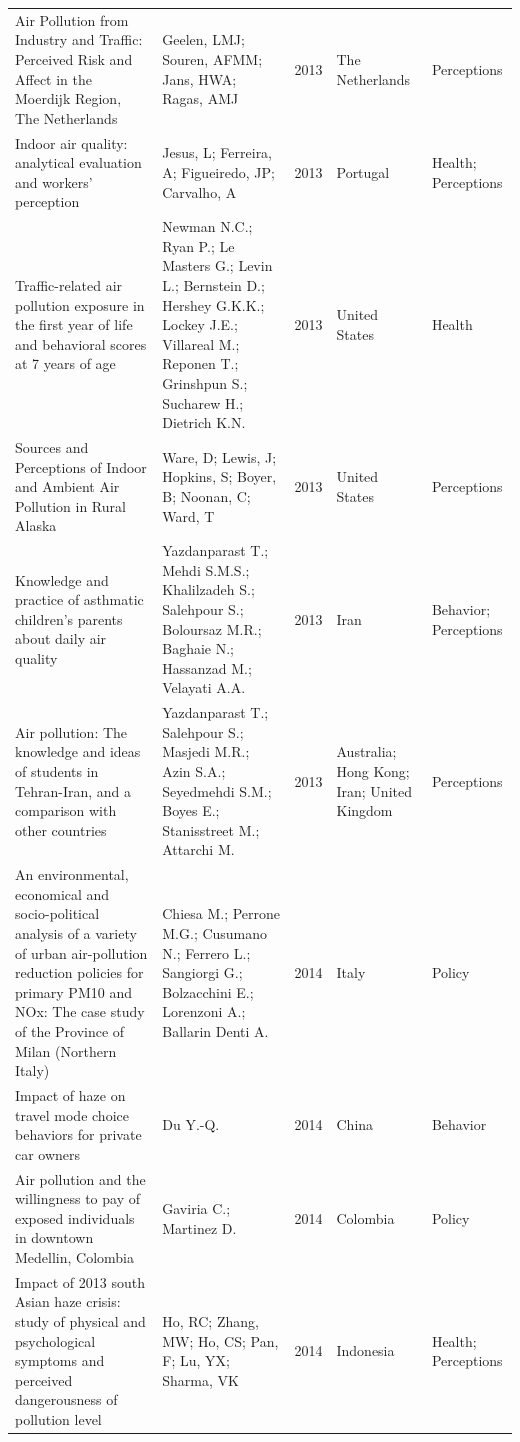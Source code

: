{\begin{longtable}[t]{p{6cm}p{3cm}lp{3cm}p{3cm}}
\addlinespace
Air Pollution from Industry and Traffic: Perceived Risk and Affect in the Moerdijk Region, The Netherlands & Geelen, LMJ; Souren, AFMM; Jans, HWA; Ragas, AMJ & 2013 & The Netherlands & Perceptions\\
Indoor air quality: analytical evaluation and workers' perception & Jesus, L; Ferreira, A; Figueiredo, JP; Carvalho, A & 2013 & Portugal & Health; Perceptions\\
Traffic-related air pollution exposure in the first year of life and behavioral scores at 7 years of age & Newman N.C.; Ryan P.; Le Masters G.; Levin L.; Bernstein D.; Hershey G.K.K.; Lockey J.E.; Villareal M.; Reponen T.; Grinshpun S.; Sucharew H.; Dietrich K.N. & 2013 & United States & Health\\
Sources and Perceptions of Indoor and Ambient Air Pollution in Rural Alaska & Ware, D; Lewis, J; Hopkins, S; Boyer, B; Noonan, C; Ward, T & 2013 & United States & Perceptions\\
Knowledge and practice of asthmatic children's parents about daily air quality & Yazdanparast T.; Mehdi S.M.S.; Khalilzadeh S.; Salehpour S.; Boloursaz M.R.; Baghaie N.; Hassanzad M.; Velayati A.A. & 2013 & Iran & Behavior; Perceptions\\
\addlinespace
Air pollution: The knowledge and ideas of students in Tehran-Iran, and a comparison with other countries & Yazdanparast T.; Salehpour S.; Masjedi M.R.; Azin S.A.; Seyedmehdi S.M.; Boyes E.; Stanisstreet M.; Attarchi M. & 2013 & Australia; Hong Kong; Iran; United Kingdom & Perceptions\\
An environmental, economical and socio-political analysis of a variety of urban air-pollution reduction policies for primary PM10 and NOx: The case study of the Province of Milan (Northern Italy) & Chiesa M.; Perrone M.G.; Cusumano N.; Ferrero L.; Sangiorgi G.; Bolzacchini E.; Lorenzoni A.; Ballarin Denti A. & 2014 & Italy & Policy\\
Impact of haze on travel mode choice behaviors for private car owners & Du Y.-Q. & 2014 & China & Behavior\\
Air pollution and the willingness to pay of exposed individuals in downtown Medellin, Colombia & Gaviria C.; Martinez D. & 2014 & Colombia & Policy\\
Impact of 2013 south Asian haze crisis: study of physical and psychological symptoms and perceived dangerousness of pollution level & Ho, RC; Zhang, MW; Ho, CS; Pan, F; Lu, YX; Sharma, VK & 2014 & Indonesia & Health; Perceptions\\

\end{longtable}}
